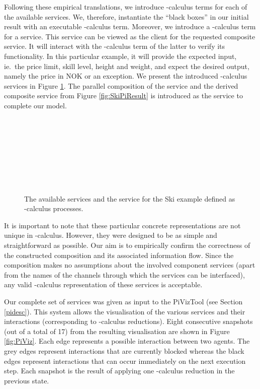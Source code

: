 \documentclass[copyright,creativecommons]{eptcs}
\begin{document}
Following these empirical translations, we introduce -calculus terms for each of the available services. We, therefore, instantiate the ``black boxes'' in our initial result with an executable -calculus term. Moreover, we introduce a -calculus term for a  service. This service can be viewed as the client for the requested composite service. It will interact with the -calculus term of the latter to verify its functionality. In this particular example, it will provide the expected input, ie.\ the price limit, skill level, height and weight, and expect the desired output, namely the price in NOK or an exception. We present the introduced -calculus services in Figure \ref{fig:AvailServPi}. The parallel composition of the  service and the derived composite service  from Figure \ref{fig:SkiPiResult} is introduced as the  service to complete our model.

\begin{figure}[htbp]
\centering
\begin{minipage}{.95\linewidth}
\begin{flushleft}
\footnotesize
 \\
	\medskip
 \\
	\medskip
 \\
	\medskip
 \\
	\medskip
 \\
	\medskip
 \\
\hspace*{1cm}   \\
	\medskip

		\end{flushleft}
		\end{minipage}
		\normalsize
	\caption{The available services and the  service for the Ski example defined as -calculus processes.}
	\label{fig:AvailServPi}
\end{figure}

It is important to note that these particular concrete representations are not unique in -calculus. However, they were designed to be as simple and straightforward as possible. Our aim is to empirically confirm the correctness of the constructed composition and its associated information flow. Since the composition makes no assumptions about the involved component services (apart from the names of the channels through which the services can be interfaced), any valid -calculus representation of these services is acceptable. 

Our complete set of services was given as input to the PiVizTool (see Section \ref{pidesc}). This system allows the visualisation of the various services and their interactions (corresponding to -calculus reductions). Eight consecutive snapshots (out of a total of 17) from the resulting visualisation are shown in Figure \ref{fig:PiViz}. Each edge represents a possible interaction between two agents. The grey edges represent interactions that are currently blocked whereas the black edges represent interactions that can occur immediately on the next execution step. Each snapshot is the result of applying one -calculus reduction in the previous state.
\end{document}
